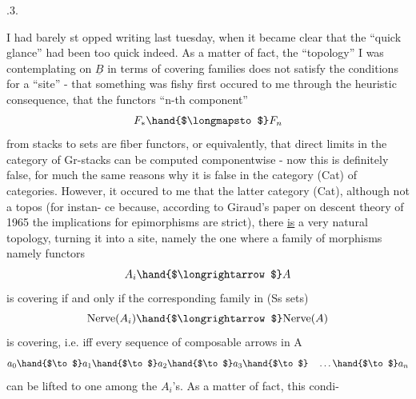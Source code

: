 .3. 

 I had barely st opped writing last tuesday,  when it became clear 
that the ``quick glance'' had been too quick indeed.  As a matter
of fact,  the ``topology'' I was contemplating on $\underline{B}$ in terms of covering
families does not satisfy the conditions for a ``site'' -  that something
was fishy first occured to me through the heuristic consequence,  that
the functors  ``n-th component''
\[ F_{*} \hand{$\longmapsto$} F_{n} \]
from  stacks to sets are fiber functors,  or equivalently, that
direct limits in the category of Gr-stacks can be computed componentwise
-  now this is definitely false,  for much the same reasons why it is
false  in the category (Cat) of categories.  However,  it occured
to me that  the latter category (Cat),  although not a topos (for instan-%
ce because, according to Giraud's paper on descent theory of 1965
the implications for epimorphisms
are strict),  there \uline{is} a very natural topology,   turning it into
a site,  namely the one where a family of morphisms namely functors
\[ A_{i} \hand{$\longrightarrow$} A \]
is covering if and only if the corresponding family in (Ss sets)
\[ \mathrm{Nerve}(A_{i}) \hand{$\longrightarrow$} \mathrm{Nerve}(A) \]
is covering,  i.e. iff every  sequence of composable arrows in A
\[ a_{0} \hand{$\to$} a_{1} \hand{$\to$} a_{2} \hand{$\to$} a_{3} \hand{$\to$} \quad \dots \hand{$\to$} a_{n} \]
can be lifted  to one among the $A_{i}$'s.  As a matter of fact,  this condi-%
